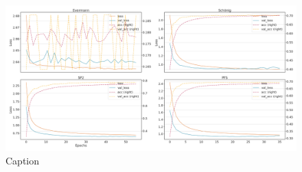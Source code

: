 \begin{figure}[!htb]
    \centering
    \includegraphics[width=\textwidth]{gfx/bpic2012/windowed_loss_acc_curve.png}
    \caption{Caption}
    \label{fig:my_label}
\end{figure}
\FloatBarrier


